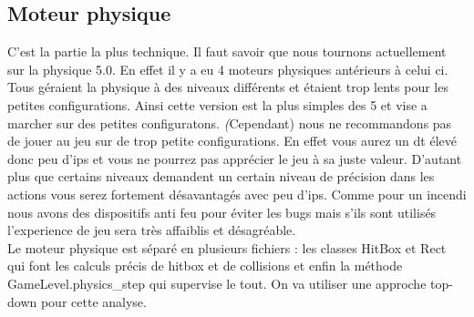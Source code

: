 \documentclass[11pt]{article}
\begin{document}
\subsection{Moteur physique}
C'est la partie la plus technique. Il faut savoir que nous tournons actuellement sur la physique 5.0. En effet il y a eu 4 moteurs physiques antérieurs à celui ci. Tous géraient la physique à des niveaux différents et étaient trop lents pour les petites configurations. Ainsi cette version est la plus simples des 5 et vise a marcher sur des petites configuratons. \emph(Cependant) nous ne recommandons pas de jouer au jeu sur de trop petite configurations. En effet vous aurez un dt élevé donc peu d'ips et vous ne pourrez pas apprécier le jeu à sa juste valeur. D'autant plus que certains niveaux demandent un certain niveau de précision dans les actions vous serez fortement désavantagés avec peu d'ips. Comme pour un incendi nous avons des dispositifs anti feu pour éviter les bugs mais s'ils sont utilisés l'experience de jeu sera très affaiblis et désagréable.\\
\indent Le moteur physique est séparé en plusieurs fichiers : les classes HitBox et Rect qui font les calculs précis de hitbox et de collisions et enfin la méthode GameLevel.physics\_step qui supervise le tout. On va utiliser une approche top-down pour cette analyse.\\
\end{document}
